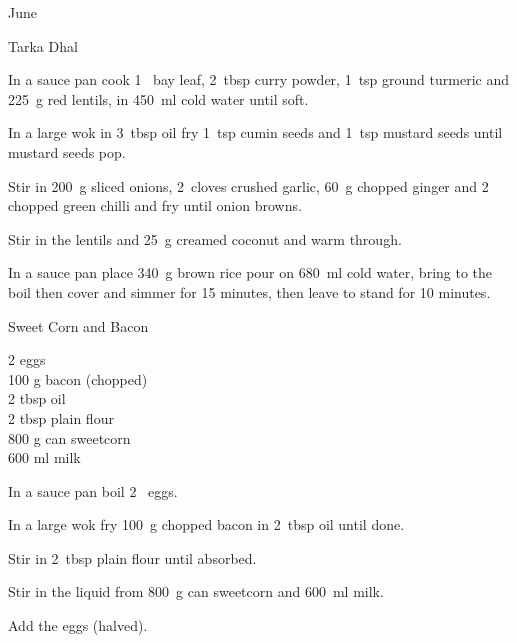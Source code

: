 \begin{menu}{June}
\begin{recipe}{2}{Tarka Dhal}
	
    \begin{instructions}
    \item 
        In a sauce pan cook
        1~  bay leaf,
        2~tbsp  curry powder,
        1~tsp  ground turmeric
        and
        225~g  red lentils,
        in
        450~ml  cold water
        until soft.
      \item 
        In a large wok in
        3~tbsp  oil
        fry
        1~tsp  cumin seeds
        and
        1~tsp  mustard seeds
        until mustard seeds pop.
      \item 
        Stir in
        200~g sliced onions,
        2~cloves crushed garlic,
        60~g chopped ginger
        and
        2~ chopped green chilli
        and
        fry until onion browns.
      \item 
        Stir in the lentils
        and
        25~g  creamed coconut
        and warm through.
      \item 
    In a
    sauce pan
    place
    340~g  brown rice
    pour on
    680~ml  cold water,
    bring to the boil then cover and simmer for 15 minutes,
    then leave to stand for 10 minutes.
  
    \end{instructions}
    \end{recipe}%
  
    \begin{recipe}{1}{Sweet Corn and Bacon}%
		\begin{ingredients}
		2  eggs  \\
	100 g bacon (chopped) \\
	2 tbsp oil  \\
	2 tbsp plain flour  \\
	800 g can sweetcorn  \\
	600 ml milk  \\
	
		\end{ingredients}
	
	
    \begin{instructions}
    \item 
        In a sauce pan boil
        2~  eggs.
      \item 
        In a large wok fry
        100~g chopped bacon
        in
        2~tbsp  oil
        until done.
      \item 
        Stir in
        2~tbsp  plain flour
        until absorbed.
      \item 
        Stir in the liquid from
        800~g  can sweetcorn
        and
        600~ml  milk.
      \item 
        Add the eggs (halved).
      
    \end{instructions}
    \end{recipe}%
  
    \clearpage
    \end{menu}
	

